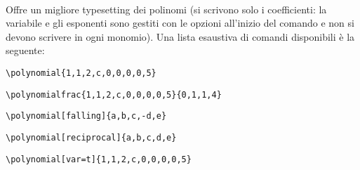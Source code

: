 \paragraph*{}Offre un migliore typesetting dei polinomi (si scrivono solo i coefficienti: la variabile e gli esponenti sono gestiti con le opzioni all'inizio del comando e non si devono scrivere in ogni monomio). Una lista esaustiva di comandi disponibili è la seguente:
\begin{center}
\begin{minipage}{.7\textwidth}
\begin{verbatim}
\polynomial{1,1,2,c,0,0,0,0,5}
\end{verbatim}
\end{minipage}
\begin{minipage}{.2\textwidth}
\end{minipage}
\begin{minipage}{.7\textwidth}
\begin{verbatim}
\polynomialfrac{1,1,2,c,0,0,0,0,5}{0,1,1,4}
\end{verbatim}
\end{minipage}
\begin{minipage}{.2\textwidth}
\end{minipage}
\begin{minipage}{.7\textwidth}
\begin{verbatim}	
\polynomial[falling]{a,b,c,-d,e}
\end{verbatim}
\end{minipage}
\begin{minipage}{.2\textwidth}\vspace{-.1cm}
\end{minipage}
\begin{minipage}{.6\textwidth}
\begin{verbatim}
\polynomial[reciprocal]{a,b,c,d,e}
\end{verbatim}
\end{minipage}
\begin{minipage}{.3\textwidth}
\end{minipage}
\begin{minipage}{.7\textwidth}
\begin{verbatim}
\polynomial[var=t]{1,1,2,c,0,0,0,0,5}

\end{verbatim}
\end{minipage}
\end{center}
